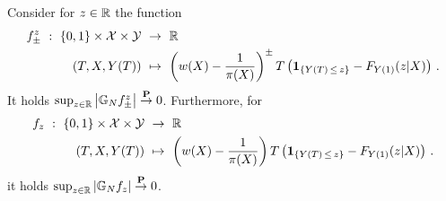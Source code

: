 \begin{lemma}

  \label{lemma_fpm}
 Consider for $z\in\mathbb{R}$ the function
 \begin{align*}
    f_{\pm}^z
    \ 
    :
    \ 
      \left\{ 0,1 \right\}
      \times
      \mathcal{X}
      \times
      \mathcal{Y}
    &
    \ 
    \to
    \ 
    \R
    \\
      (T,X,Y(T))
    &
      \ 
      \mapsto
      \ 
      \left( 
      w(X)-\frac{1}{\pi(X)}
      \right)
      ^{\pm}
      T
      \left( 
        \mathbf{1}
        _{\left\{  Y(T)\,\le\,z \right\}}
        -
        F_{Y(1)}(z|X)
      \right)
      \,.
  \end{align*}
  It holds
  $\sup_{z\in\mathbb{R}}\left| \mathbb{G}_N f^z_\pm \right|\overset{\mathbf{P}}{\to}0$.
  Furthermore, for
 \begin{align*}
    f_z
    \ 
    :
    \ 
      \left\{ 0,1 \right\}
      \times
      \mathcal{X}
      \times
      \mathcal{Y}
    &
    \ 
    \to
    \ 
    \R
    \\
      (T,X,Y(T))
    &
      \ 
      \mapsto
      \ 
      \left( 
      w(X)-\frac{1}{\pi(X)}
      \right)
      T
      \left( 
        \mathbf{1}
        _{\left\{  Y(T)\,\le\,z \right\}}
        -
        F_{Y(1)}(z|X)
      \right)
      \,.
  \end{align*}
  it holds
  $\sup_{z\in\mathbb{R}}\left| \mathbb{G}_N f_z \right|\overset{\mathbf{P}}{\to}0$.
\end{lemma}
